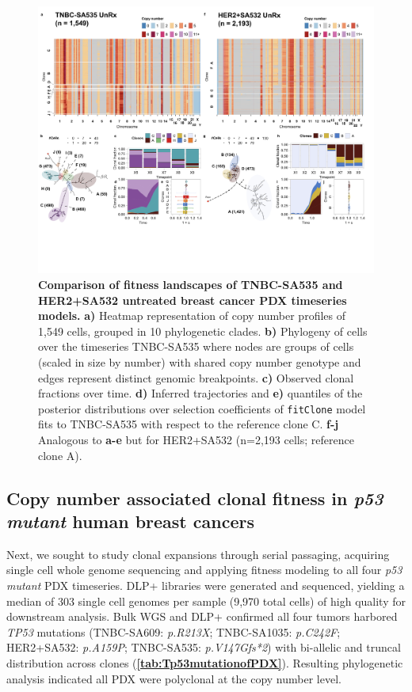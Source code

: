 \begin{figure}
\centering
\includegraphics[width=\textwidth]{Figures/chap4/SA535_SA532.png}
	
\caption[Untreated PDX timeseries clonal dynamics at single cell level]
	{\small
	\textbf{Comparison of fitness landscapes of TNBC-SA535 and HER2+SA532 untreated breast cancer PDX timeseries models.}
	    \textbf{a)} Heatmap representation of copy number profiles of 1,549 cells, grouped in 10 phylogenetic clades. \textbf{b)} Phylogeny of cells over the timeseries TNBC-SA535 where nodes are groups of cells (scaled in size by number) with shared copy number genotype and edges represent distinct genomic breakpoints. \textbf{c)} Observed clonal fractions over time. \textbf{d)} Inferred trajectories and \textbf{e)} quantiles of the posterior distributions over selection coefficients of \texttt{fitClone} model fits to TNBC-SA535 with respect to the reference clone C. \textbf{f-j} Analogous to \textbf{a-e} but for HER2+SA532 (n=2,193 cells; reference clone A).}
\label{fig:SA535heatmapdynamicsHER2}
\end{figure}

\subsection{Copy number associated clonal fitness in \textit{p53 mutant} human breast cancers}

Next, we sought to study clonal expansions through serial passaging, acquiring single cell whole genome sequencing and applying fitness modeling to all four \textit{p53 mutant} PDX timeseries.
DLP+ libraries were generated and sequenced, yielding a median of 303 single cell genomes per sample (9,970 total cells) of high quality for downstream analysis. Bulk WGS and DLP+ confirmed all four tumors harbored \textit{TP53} mutations (TNBC-SA609: \textit{p.R213X}; TNBC-SA1035: \textit{p.C242F}; HER2+SA532: \textit{p.A159P}; TNBC-SA535: \textit{p.V147Gfs*2}) with bi-allelic and truncal distribution across clones (\textbf{\autoref{tab:Tp53mutationofPDX}}).
Resulting phylogenetic analysis indicated all PDX were polyclonal at the copy number level.


